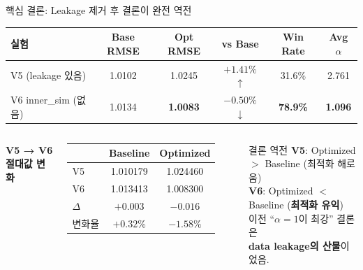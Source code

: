 \documentclass[aspectratio=169,10pt]{beamer}
\begin{document}
\begin{frame}{핵심 결론: Leakage 제거 후 결론이 완전 역전}
	\begin{center}
	\renewcommand{\arraystretch}{1.4}
	\begin{tabular}{l|c|c|c|c|c}
		\toprule
		\textbf{실험} & \textbf{Base RMSE} & \textbf{Opt RMSE} & \textbf{vs Base} & \textbf{Win Rate} & \textbf{Avg $\alpha$} \\
		\midrule
		V5 (leakage 있음)       & 1.0102 & 1.0245 & $+1.41\%$ \textcolor{negred}{$\uparrow$} & 31.6\% & 2.761 \\
		\rowcolor{testgreen!15}
		V6 inner\_sim (없음) & 1.0134 & \textbf{1.0083} & $\mathbf{-0.50\%}$ \textcolor{testgreen}{$\downarrow$} & \textbf{78.9\%} & \textbf{1.096} \\
		\bottomrule
	\end{tabular}
	\end{center}

	\vspace{0.4em}
	\begin{columns}[T]
			\textbf{V5 → V6 절대값 변화}
			\renewcommand{\arraystretch}{1.2}
			\begin{tabular}{l|c|c}
				\toprule
				& Baseline & Optimized \\
				\midrule
				V5 & 1.010179 & 1.024460 \\
				V6 & 1.013413 & 1.008300 \\
				\midrule
				$\Delta$ & $+0.003$ & $-0.016$ \\
				변화율 & $+0.32\%$ & $-1.58\%$ \\
				\bottomrule
			\end{tabular}

			\begin{alertblock}{결론 역전}
				\textbf{V5}: Optimized $>$ Baseline (최적화 해로움)\\
				\textbf{V6}: Optimized $<$ Baseline (\textbf{최적화 유익})\\[0.4em]
				이전 ``$\alpha=1$이 최강'' 결론은\\
				\textbf{data leakage의 산물}이었음.
			\end{alertblock}
	\end{columns}
\end{frame}
\end{document}
